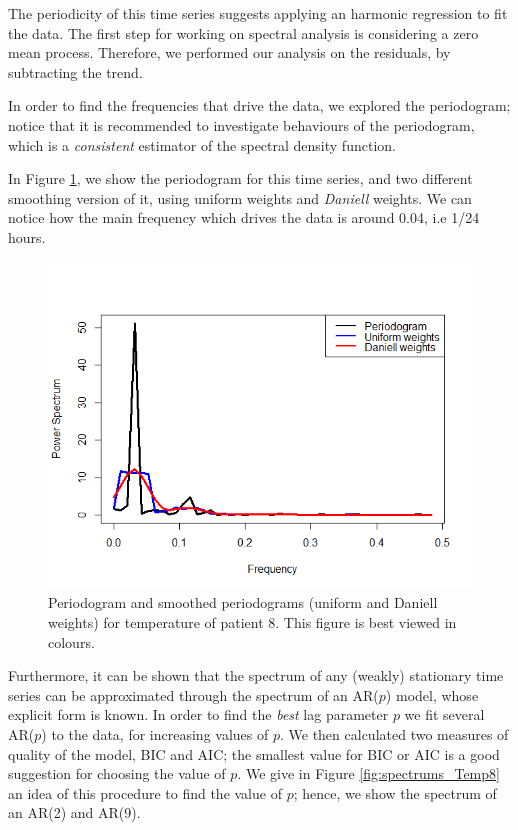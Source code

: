 \documentclass[]{article}
\begin{document}
The periodicity of this time series suggests applying an harmonic regression to fit the data. The first step for working on spectral analysis is considering a zero mean process. Therefore, we performed our analysis on the residuals, by subtracting the trend. 

In order to find the frequencies that drive the data, we explored the periodogram; notice that it is recommended to investigate behaviours of the  periodogram, which is a \textit{consistent} estimator of the spectral density function. 

In Figure \ref{fig:period_Temp8}, we show the periodogram for this time series, and two different smoothing version of it, using uniform weights and \textit{Daniell} weights. We can notice how the main frequency which drives the data is around 0.04, i.e 1/24 hours.

\begin{figure}[htbp]\centering
	\includegraphics[scale = 0.4]{Temp8_Periodograms.png}
	\caption{Periodogram and smoothed periodograms (uniform and Daniell weights) for temperature of patient 8. This figure is best viewed in colours.}
	\label{fig:period_Temp8}
\end{figure}

\vspace{0.1cm}
Furthermore, it can be shown that the spectrum of any (weakly) stationary time series can be approximated through the spectrum of an AR($p$) model, whose explicit form is known. In order to find the \textit{best} lag parameter $p$ we fit several AR($p$) to the data, for increasing values of $p$. We then calculated two measures of quality of the model, BIC and AIC; the smallest value for BIC or AIC is a good suggestion for choosing the value of $p$. We give in Figure \ref{fig:spectrums_Temp8} an idea of this procedure to find the value of $p$; hence, we show the spectrum of an AR(2) and AR(9). 
\end{document}
